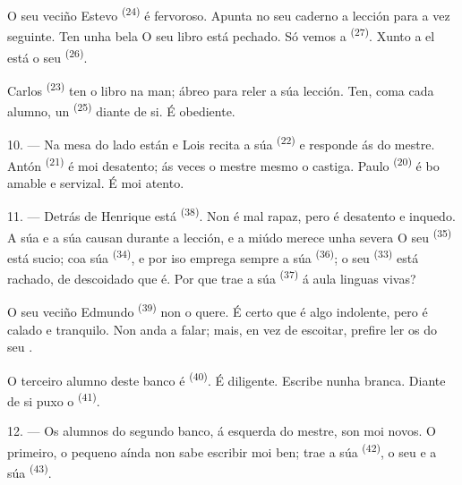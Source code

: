 O seu veciño Estevo \textsuperscript{(24)} é fervoroso. Apunta no seu caderno a
lección para a vez seguinte. Ten unha bela  O seu libro está pechado.
Só vemos a  \textsuperscript{(27)}. Xunto a el está o seu
 \textsuperscript{(26)}.

Carlos \textsuperscript{(23)} ten o libro na man; ábreo para reler a súa lección.
Ten, coma cada alumno, un  \textsuperscript{(25)} diante de si. É
obediente.

10. --- Na mesa do lado están  e  Lois recita a
súa  \textsuperscript{(22)} e responde ás  do
mestre. Antón \textsuperscript{(21)} é moi desatento; ás veces o mestre mesmo o
castiga. Paulo \textsuperscript{(20)} é bo  amable e servizal. É
moi atento.

\VUsaut{4.2mm}
\VUsaut{3.2mm}

11. --- Detrás de Henrique está  \textsuperscript{(38)}. Non é mal
rapaz, pero é  desatento e inquedo. A súa  e a
súa  causan  durante a lección, e a miúdo
merece unha severa  O seu 
\textsuperscript{(35)} está sucio;  coa súa 
\textsuperscript{(34)}, e por iso emprega sempre a súa 
\textsuperscript{(36)}; o seu  \textsuperscript{(33)} está rachado,
de descoidado que é. Por que trae a súa 
\textsuperscript{(37)} á aula  linguas vivas?

O seu veciño Edmundo \textsuperscript{(39)} non o quere. É certo que é algo
indolente, pero é calado e tranquilo. Non anda a falar; mais, en vez de escoitar, prefire
ler os  do seu .

O terceiro alumno deste banco é  \textsuperscript{(40)}. É
diligente. Escribe nunha  branca. Diante de si puxo o
 \textsuperscript{(41)}.

12. --- Os alumnos do segundo banco, á esquerda do mestre, son moi novos. O primeiro,
o pequeno  aínda non sabe escribir moi ben; trae a súa
 \textsuperscript{(42)}, o seu  e a súa
 \textsuperscript{(43)}.

